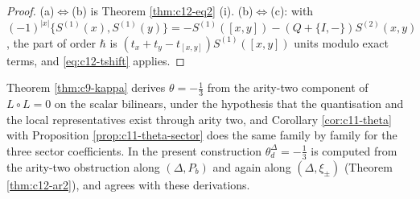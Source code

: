 \begin{proof}
(a)$\Leftrightarrow$(b) is Theorem \ref{thm:c12-eq2} (i). (b)$\Leftrightarrow$(c): with $(-1)^{|x|}\{S^{(1)}(x),S^{(1)}(y)\}=-S^{(1)}([x,y])-(Q+\{I,-\})S^{(2)}(x,y)$, the part of order $\hbar$ is $(t_x+t_y-t_{[x,y]})S^{(1)}([x,y])$ units modulo exact terms, and \eqref{eq:c12-tshift} applies.
\end{proof}

\begin{remark}
\label{rem:c12-thetacheck}
Theorem \ref{thm:c9-kappa} derives $\theta=-\tfrac13$ from the arity-two component of $L\circ L=0$ on the scalar bilinears, under the hypothesis that the quantisation and the local representatives exist through arity two, and Corollary \ref{cor:c11-theta} with Proposition \ref{prop:c11-theta-sector} does the same family by family for the three sector coefficients. In the present construction $\theta^\Delta_d=-\tfrac13$ is computed from the arity-two obstruction along $(\Delta,P_b)$ and again along $(\Delta,\xi_\pm)$ (Theorem \ref{thm:c12-ar2}), and agrees with these derivations.
\end{remark}

